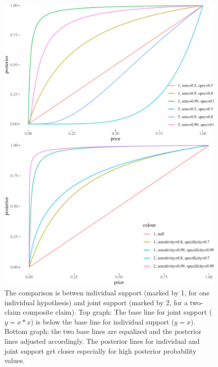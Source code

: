 \documentclass[10pt,dvipsnames,enabledeprecatedfontcommands]{scrartcl}
\begin{document}
\begin{figure}


\begin{center}\includegraphics[width=0.9\linewidth]{conjunction-paradox_files/figure-latex/unnamed-chunk-13-1} \end{center}


\begin{center}\includegraphics[width=0.9\linewidth]{conjunction-paradox_files/figure-latex/unnamed-chunk-14-1} \end{center}

\caption{The comparison is betwen individual support (marked by 1, for one individual 
hypothesis) and joint support (marked by 2, for a two-claim composite claim). 
Top graph: The base line for joint support ($y=x*x$) is 
below the base line for individual support ($y=x$).
Bottom graph: the two base lines are equalized and the 
posterior lines adjusted accordingly. The posterior 
lines for individual and joint support 
get closer especially for high posterior probability values.}
\label{fig:post-indiv-joint}
\end{figure}
\end{document}

